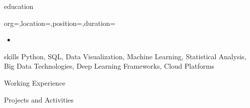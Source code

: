 \documentclass{resume}
\begin{document}
\makeheader

\begin{ResumeSection}{education}
    \begin{ResumeSubsection}{org={},location={},position={},duration={}}
        \begin{itemize}
            \item 
        \end{itemize}
    \end{ResumeSubsection}
\end{ResumeSection}

\begin{ResumeSection}{skills}
    \noindent
    Python, SQL, Data Visualization, Machine Learning, Statistical Analysis, Big Data Technologies, Deep Learning Frameworks, Cloud Platforms
\end{ResumeSection}

\begin{ResumeSection}{Working Experience}
\end{ResumeSection}

\begin{ResumeSection}{Projects and Activities}
\end{ResumeSection}
\end{document}
